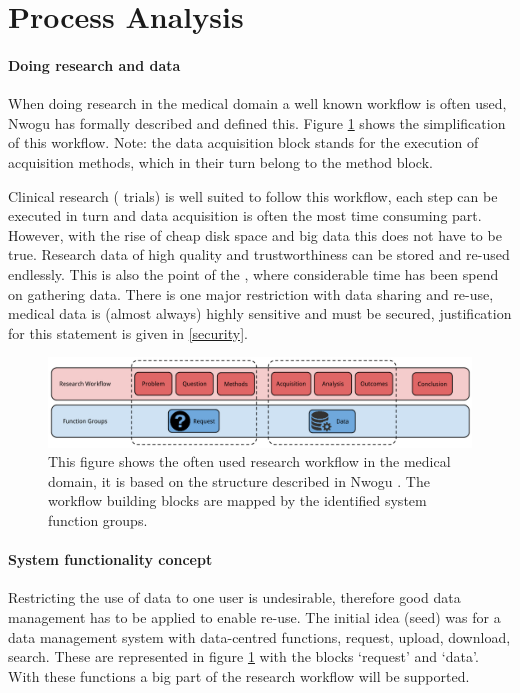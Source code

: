 \section{Process Analysis}
\label{process-analysis}

\paragraph{Doing research and \project{} data}
When doing research in the medical domain a well known workflow is often used, Nwogu \cite{nwogu} has formally described and defined this.
Figure \ref{fig:research-workflow} shows the simplification of this workflow.
Note: the data acquisition block stands for the execution of acquisition methods, which in their turn belong to the method block.

Clinical research (\eg{} trials) is well suited to follow this workflow, each step can be executed in turn and data acquisition is often the most time consuming part.
However, with the rise of cheap disk space and big data this does not have to be true.
Research data of high quality and trustworthiness can be stored and re-used endlessly.
This is also the point of the \project{}, where considerable time has been spend on gathering data.
There is one major restriction with data sharing and re-use, medical data is (almost always) highly sensitive and must be secured, justification for this statement is given in \ref{security}.

\begin{figure}[hb]
	\centering
	\includegraphics[width=1.0\linewidth]{images/research-workflow}
	\caption{
		This figure shows the often used research workflow in the medical domain, it is based on the structure described in Nwogu \cite{nwogu}.
		The workflow building blocks are mapped by the identified system function groups.
	}
	\label{fig:research-workflow}
\end{figure}

\paragraph{System functionality concept}
Restricting the use of data to one user is undesirable, therefore good data management has to be applied to enable re-use.
The initial idea (seed) was for a data management system with data-centred functions, \eg{} request, upload, download, search.
These are represented in figure \ref{fig:research-workflow} with the blocks `request' and `data'.
With these functions a big part of the research workflow will be supported.

